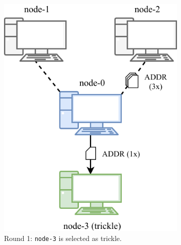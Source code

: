 \begin{figure}[h!]
	\begin{subfigure}{.4\textwidth}
		\vspace*{0.25cm}
		\includegraphics[width=\columnwidth]{figures/trickling_1}
		\vspace*{0.1cm}
		\caption{
			Round \num{1}:
			\texttt{node-3} is selected as trickle.
		}
		\vspace*{0.2cm}
	\end{subfigure}
	\hfill
	\begin{subfigure}{.4\textwidth}
		\vspace*{0.25cm}

\end{subfigure}
\end{figure}
